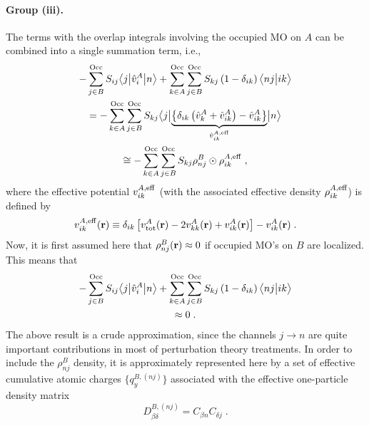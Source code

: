 \paragraph{Group (iii).}
The terms with the overlap integrals involving the occupied MO on $A$
can be combined into a single summation term, i.e.,
\begin{multline}
       - \sum_{j\in B}^{\rm Occ} S_{ij} \tBraKet{j}{\hat{v}^A_{i} }{n}  
     + \sum_{k\in A}^{\rm Occ} \sum_{j\in B}^{\rm Occ}  
        S_{kj} \left( 1 - \delta_{ik} \right) 
        \BraKet{nj}{ik} \\ = -
 \sum_{k\in A}^{\rm Occ} 
 \sum_{j\in B}^{\rm Occ}
 S_{kj} 
 \tBraKet{j}{
 \underbrace{
 \left\{ 
  \delta_{ik} \left( \hat{v}^A_{k} + \hat{v}^A_{ik} \right)
  - \hat{v}^A_{ik}
 \right\} 
  }_{\hat{v}^{A,{\rm eff}}_{ik}}
 }{n}  \\ \cong -
%
  \sum_{k\in A}^{\rm Occ} 
 \sum_{j\in B}^{\rm Occ}
 S_{kj} 
 \rho_{nj}^B \odot \rho^{A,{\rm eff}}_{ik} \;,
\end{multline}
%
where the effective potential ${v}^{A,{\rm eff}}_{ik}$ (with the associated 
effective density $\rho^{A,{\rm eff}}_{ik}$) 
is defined by
%
\begin{equation} \label{e:ct.group-iii.oep}
 {v}^{A,{\rm eff}}_{ik}({\bf r}) \equiv
 \delta_{ik} 
 \left[
  v^A_{\rm tot} ({\bf r}) - 2 v^A_{kk} ({\bf r}) + v^A_{ik} ({\bf r})
 \right] 
  - v^A_{ik} ({\bf r}) \;.
\end{equation}
%
Now, it is first assumed here that $\rho^{B}_{nj} ({\bf r}) \approx 0$ if occupied MO's on $B$ are localized.
This means that
%
\begin{multline} \label{e:ct.group-iii.final.a}
        - \sum_{j\in B}^{\rm Occ} S_{ij} \bigl\langle {j} \bigl\lvert {\hat{v}^A_{i} } \bigl\lvert {n} \bigr\rangle  
     + \sum_{k\in A}^{\rm Occ} \sum_{j\in B}^{\rm Occ}  
        S_{kj} \left( 1 - \delta_{ik} \right) 
        \bigl\langle {nj} \bigl\lvert {ik} \bigr\rangle  \\
 \approx 0 \;.
\end{multline}
%
The above result is a crude approximation, since the channels $j\rightarrow n$
are quite important contributions in most of perturbation theory treatments.
In order to include the $\rho^{B}_{nj}$ density, it is approximately represented here by a set of effective 
cumulative
atomic charges $\{ q^{B,(nj)}_{y} \}$ associated with the effective one\hyp{}particle density matrix
%
\begin{equation}
 D^{B,(nj)}_{\beta\delta} = C_{\beta n} C_{\delta j} \;.
\end{equation}
